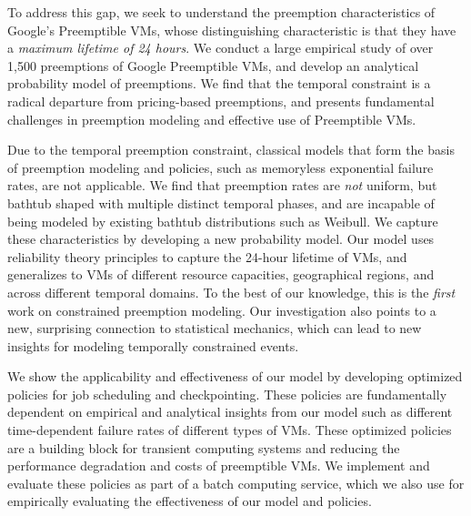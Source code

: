 To address this gap, we seek to understand the preemption characteristics of Google's Preemptible VMs, whose distinguishing characteristic is that they have a \emph{maximum lifetime of 24 hours}. 
We conduct a large empirical study of over 1,500 preemptions of Google Preemptible VMs, and develop an analytical probability model of preemptions. 
We find that the temporal constraint is a radical departure from pricing-based preemptions, and presents fundamental challenges in preemption modeling and effective use of Preemptible VMs.



Due to the temporal preemption constraint, classical models that form the basis of preemption modeling and policies, such as memoryless exponential failure rates, are not applicable.
We find that preemption rates are \emph{not} uniform, but bathtub shaped with multiple distinct temporal phases, and are incapable of being modeled by existing bathtub distributions such as Weibull. 
We capture these characteristics by developing a new probability model. 
Our model uses reliability theory principles to capture the 24-hour lifetime of VMs, and generalizes to VMs of different resource capacities, geographical regions, and across different temporal domains. 
To the best of our knowledge, this is the \emph{first} work on constrained preemption modeling. 
%
Our investigation also points to a new, surprising connection to statistical mechanics, which can lead to new insights for modeling  temporally constrained events. 


We show the applicability and effectiveness of our model by developing optimized policies for job scheduling and  checkpointing. 
These policies are fundamentally dependent on empirical and analytical insights from our model such as different time-dependent failure rates of different types of VMs. 
These optimized policies are a building block for transient computing systems and reducing the performance degradation and costs of preemptible VMs. 
We implement and evaluate these policies as part of a batch computing service, which we also use for empirically evaluating the effectiveness of our model and policies. 





